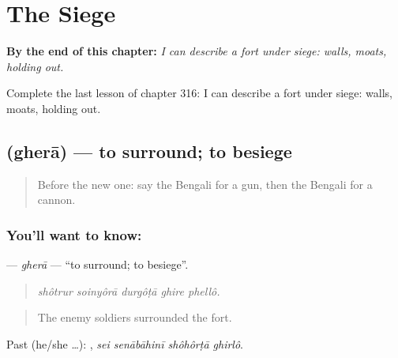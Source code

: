 
\chapter{The Siege}
\label{ch:bn-the-siege}

\begin{chapteropening}
\textbf{By the end of this chapter:} \emph{I can describe a fort under siege: walls, moats, holding out.}

Complete the last lesson of chapter 316: I can describe a fort under siege: walls, moats, holding out.
\end{chapteropening}

\section[\texorpdfstring{\bn{ঘেরা} (gherā)}{ঘেরা (gherā)}]{ (gherā) — to surround; to besiege}

\label{lesson:BN-C316-ghera}



\begin{quote}
Before the new one: say the Bengali for a gun, then the Bengali for a cannon.
\end{quote}

\subsection*{You'll want to know: }
\textbf{} — \emph{gherā} — \textquotedblleft{}to surround; to besiege\textquotedblright{}.

\begin{quote}
    
\end{quote}

\begin{quote}
\emph{shôtrur soinyôrā durgôṭā ghire phellô.}
\end{quote}

\begin{quote}
The enemy soldiers surrounded the fort.
\end{quote}

Past (he/she …):    , \emph{sei senābāhinī shôhôrṭā ghirlô}.

